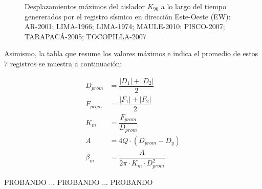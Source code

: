 \begin{figure}[H]
\begin{subfigure}[b]{0.99\linewidth}
  \caption{}
  \label{i4_2.7}
\end{subfigure}
    \caption[Desplazamientos máximos del aislador $K_{90}$ a lo largo del tiempo genererados por el registro sísmico en dirección Este-Oeste (EW)]{Desplazamientos máximos del aislador $K_{90}$ a lo largo del tiempo genererados por el registro sísmico en dirección Este-Oeste (EW):
     AR-2001;
     LIMA-1966;
     LIMA-1974;
     MAULE-2010;
     PISCO-2007;
     TARAPACÁ-2005;
     TOCOPILLA-2007
    }
    \label{i4_2}
\end{figure}

Asimismo, la tabla que resume los valores máximos e indica el promedio de estos 7 registros se muestra a continuación:

\begin{align*}
    D_{prom} &= \dfrac{|D_1| + |D_2|}{2} \\
    F_{prom} &= \dfrac{|F_1| + |F_2|}{2} \\
    K_m &= \dfrac{F_{prom}}{D_{prom}} \\
    A &= 4Q \cdot (D_{prom} - D_y) \\
    \beta_m &= \dfrac{A}{2\pi \cdot K_m \cdot D_{prom}^2}
\end{align*}

PROBANDO ... PROBANDO ... PROBANDO

